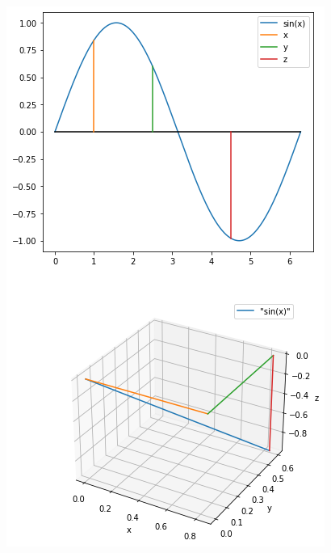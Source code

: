 \begin{frame}[fragile]
\begin{columns}[T]
\begin{center}
	\includegraphics[width=\linewidth]{./gfx/sin-projection}
\end{center}
\end{columns}
%
\end{frame}


